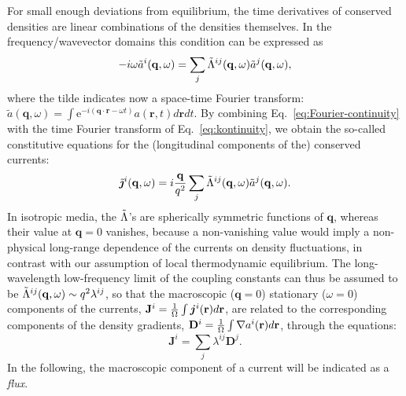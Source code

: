 For small enough deviations from equilibrium, the time derivatives of conserved densities are linear combinations of the densities themselves. In the frequency/wavevector domains this condition can be expressed as
\begin{equation}
  -i\omega\tilde a^i(\mathbf{q},\omega) = \sum_j \tilde\rLambda^{ij}(\mathbf{q},\omega) \tilde a^j(\mathbf{q},\omega), \label{eq:Fourier-continuity}
\end{equation}
where the tilde indicates now a space-time Fourier transform: $\tilde a(\mathbf{q},\omega) = \int \mathrm{e}^{-i(\mathbf{q}\cdot \mathbf{r}-\omega t)} a(\mathbf{r},t)d\mathbf{r}dt $. By combining Eq.~\eqref{eq:Fourier-continuity} with the time Fourier transform of Eq.~\eqref{eq:kontinuity}, we obtain the so-called constitutive equations for the (longitudinal components of the) conserved currents:
\begin{equation}
  \tilde{\bm{\jmath}}^i(\mathbf{q},\omega)=i\frac{\mathbf{q}}{q^2} \sum_j\tilde \rLambda^{ij}(\mathbf{q},\omega)\tilde a^j(\mathbf{q},\omega). \label{eq:constitutive-qomega}
\end{equation}
In isotropic media, the $\tilde{{\mathrm\Lambda}}$'s are spherically symmetric functions of $\mathbf{q}$, whereas their value at $\mathbf{q}=0$ vanishes, because a non-vanishing value would imply a non-physical long-range dependence of the currents on density fluctuations, in contrast with our assumption of local thermodynamic equilibrium. The long-wavelength low-frequency limit of the coupling constants can thus be assumed to be $\tilde{{\mathrm\Lambda}}^{ij}(\mathbf{q},\omega) \sim q^2 \lambda^{ij}$, so that the macroscopic ($\mathbf{q}=0$) stationary ($\omega=0$) components of the currents, $\mathbf{J}^i = \frac{1}{{\mathrm\Omega}} \int\bm j^i (\mathbf{r}) d\mathbf{r}$, are related to the corresponding components of the density gradients, $\mathbf{D}^i=\frac{1}{{\mathrm\Omega}}\int\nabla a^i(\mathbf{r})d\mathbf{r}$, through the equations:
\begin{equation}
  \mathbf{J}^i=\sum_j \lambda^{ij}\mathbf{D}^j. \label{eq:constitutive}
\end{equation}
In the following, the macroscopic component of a current will be indicated as a \emph{flux}.

